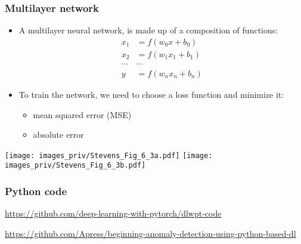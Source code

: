 \documentclass[english,10pt,aspectratio=169,fleqn]{beamer}
\begin{document}
\begin{frame} %
\frametitle{Multilayer network}

\begin{itemize}
\item A multilayer neural network, is made up of a composition of functions:
\begin{align*}
x_{1} & = f(w_0 x + b_0) \\
x_{2} & = f(w_1 x_1 + b_1) \\
\cdots & \cdots \\
y & = f(w_n x_n + b_n)
\end{align*}
\item To train the network, we need to choose a loss function and minimize it:
\begin{itemize}
\item mean squared error (MSE)
\item absolute error
\end{itemize}
\end{itemize}

\end{frame}


\begin{frame} %

{\centering
\texttt{[image: images\_priv/Stevens\_Fig\_6\_3a.pdf]}
\texttt{[image: images\_priv/Stevens\_Fig\_6\_3b.pdf]}
\par}
  
\end{frame}



\begin{frame}
\frametitle{Python code}

\url{https://github.com/deep-learning-with-pytorch/dlwpt-code}

\url{https://github.com/Apress/beginning-anomaly-detection-using-python-based-dl}

\end{frame}
\end{document}
